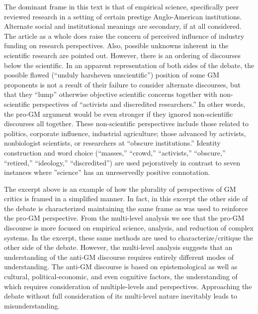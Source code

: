 The dominant frame in this text is that of empirical science, specifically peer reviewed research in a setting of certain prestige Anglo-American institutions. Alternate social and institutional meanings are secondary, if at all considered. The article as a whole does raise the concern of perceived influence of industry funding on research perspectives. Also, possible unknowns inherent in the scientific research are pointed out. However, there is an ordering of discourses below the scientific. In an apparent representation of both sides of the debate, the possible flawed (``unduly harsh\textemdash even unscientific'') position of some GM proponents is not a result of their failure to consider alternate discourses, but that they ``lump'' otherwise objective scientific concerns together with non-scientific perspectives of ``activists and discredited researchers.'' In other words, the pro-GM argument would be even stronger if they ignored non-scientific discourses all together. These non-scientific perspectives include those related to politics, corporate influence, industrial agriculture; those advanced by activists, nonbiologist scientists, or researchers at ``obscure institutions.'' Identity construction and word choice (``masses,'' ``crowd,'' ``activists,'' ``obscure,'' ``retired,'' ``ideology,'' ``discredited'') are used pejoratively in contrast to seven instances where ''science'' has an unreservedly positive connotation.

The excerpt above is an example of how the plurality of perspectives of GM critics is framed in a simplified manner. In fact, in this excerpt the other side of the debate is characterized maintaining the same frame as was used to reinforce the pro-GM perspective. From the multi-level analysis we see that the pro-GM discourse is more focused on empirical science, analysis, and reduction of complex systems. In the excerpt, these same methods are used to characterize/critique the other side of the debate. However, the multi-level analysis suggests that an understanding of the anti-GM discourse requires entirely different modes of understanding. The anti-GM discourse is based on epistemological as well as cultural, political-economic, and even cognitive factors, the understanding of which requires consideration of multiple-levels and perspectives. Approaching the debate without full consideration of its multi-level nature inevitably leads to misunderstanding. 